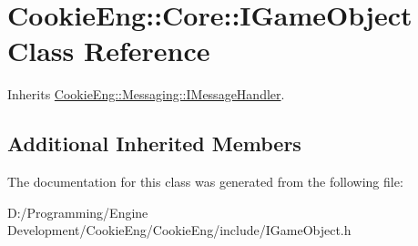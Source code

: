\hypertarget{class_cookie_eng_1_1_core_1_1_i_game_object}{}\section{Cookie\+Eng\+:\+:Core\+:\+:I\+Game\+Object Class Reference}
\label{class_cookie_eng_1_1_core_1_1_i_game_object}


Inherits \hyperlink{class_cookie_eng_1_1_messaging_1_1_i_message_handler}{Cookie\+Eng\+::\+Messaging\+::\+I\+Message\+Handler}.

\subsection*{Additional Inherited Members}


The documentation for this class was generated from the following file\+:\begin{DoxyCompactItemize}
\item 
D\+:/\+Programming/\+Engine Development/\+Cookie\+Eng/\+Cookie\+Eng/include/I\+Game\+Object.\+h\end{DoxyCompactItemize}
